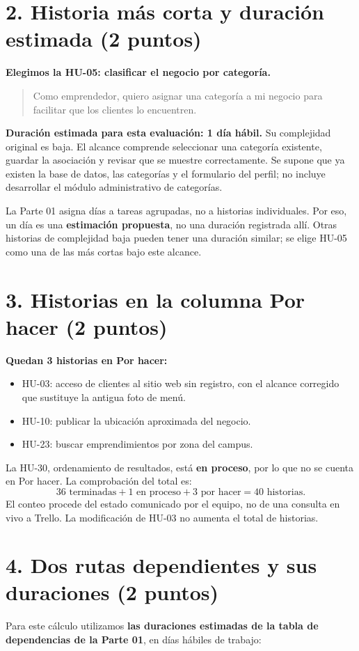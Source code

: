 \documentclass[11pt,letterpaper]{article}
\newcommand{\hu}[1]{\mbox{HU-#1}}
\begin{document}
\section*{2. Historia más corta y duración estimada (2 puntos)}
\textbf{Elegimos la \hu{05}: clasificar el negocio por categoría.}

\begin{quote}
Como emprendedor, quiero asignar una categoría a mi negocio para facilitar
que los clientes lo encuentren.
\end{quote}

\textbf{Duración estimada para esta evaluación: 1 día hábil.} Su complejidad
original es baja. El alcance comprende seleccionar una categoría existente,
guardar la asociación y revisar que se muestre correctamente. Se supone que
ya existen la base de datos, las categorías y el formulario del perfil; no
incluye desarrollar el módulo administrativo de categorías.

La Parte 01 asigna días a tareas agrupadas, no a historias individuales. Por
eso, un día es una \textbf{estimación propuesta}, no una duración registrada
allí. Otras historias de complejidad baja pueden tener una duración similar;
se elige HU-05 como una de las más cortas bajo este alcance.

\section*{3. Historias en la columna Por hacer (2 puntos)}
\textbf{Quedan 3 historias en Por hacer:}
\begin{itemize}
\item \hu{03}: acceso de clientes al sitio web sin registro, con el alcance
corregido que sustituye la antigua foto de menú.
\item \hu{10}: publicar la ubicación aproximada del negocio.
\item \hu{23}: buscar emprendimientos por zona del campus.
\end{itemize}

La \hu{30}, ordenamiento de resultados, está \textbf{en proceso}, por lo que
no se cuenta en Por hacer. La comprobación del total es:
\[
36\text{ terminadas}+1\text{ en proceso}+3\text{ por hacer}
=\boxed{40\text{ historias}}.
\]
El conteo procede del estado comunicado por el equipo, no de una consulta en
vivo a Trello. La modificación de HU-03 no aumenta el total de historias.

\section*{4. Dos rutas dependientes y sus duraciones (2 puntos)}
Para este cálculo utilizamos \textbf{las duraciones estimadas de la tabla de
dependencias de la Parte 01}, en días hábiles de trabajo:
\end{document}
